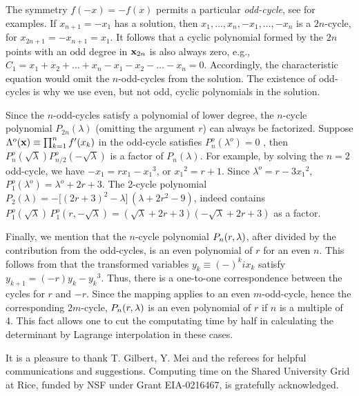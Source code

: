 \documentclass{ws-ijbc}
\begin{document}
The symmetry $f(-x) = -f(x)$ permits
  a particular \emph{odd-cycle},
  see  for examples.
If $x_{n+1} = -x_1$ has a solution,
  then $x_1, \ldots, x_{n}, -x_1, \ldots, -x_{n}$
  is a $2n$-cycle, for $x_{2n+1} = - x_{n+1} = x_1$.
%
It follows that a cyclic polynomial
  formed by the $2n$ points
  with an odd degree in $\mathbf{x}_{2n}$
  is also always zero,
  e.g., $C_1 = x_1 + x_2 + \dots + x_n - x_1 - x_2 - \dots - x_n = 0$.
Accordingly, the characteristic equation 
  would omit the $n$-odd-cycles from the solution.
The existence of odd-cycles is why we use even, but not odd,
  cyclic polynomials in the solution.


Since the $n$-odd-cycles satisfy a polynomial of lower degree,
  the $n$-cycle polynomial $P_{2n}(\lambda)$
  (omitting the argument $r$)
  can always be factorized.
%
Suppose $\Lambda^o(\mathbf{x}) \equiv \prod_{k = 1}^{n} f'(x_k)$ in the odd-cycle
 satisfies $P_{n}^o(\lambda^o) = 0$
\big[where $\lambda^o$ is the value of $\Lambda^o(\vx)$,
and $\lambda^o = \pm\sqrt \lambda$\,\big],
then $P^o_{n}(\sqrt \lambda) P^o_{n/2}(-\sqrt \lambda)$
is a factor of $P_{n}(\lambda)$.
%
For example, by solving the $n = 2$ odd-cycle,
  we have $- x_1 = r x_1 - {x_1}^3$, or ${x_1}^2 = r + 1$.
Since $\lambda^o = r - 3 {x_1}^2$,
$P^o_1(\lambda^o) = \lambda^o + 2 r + 3$.
%
The 2-cycle polynomial
  $P_2(\lambda) = -\big[(2r+3)^2 - \lambda\big]\,(\lambda + 2r^2-9)$,
  indeed contains
  $P^o_1(\sqrt \lambda) \, P^o_1(r, -\sqrt \lambda)
   = (\sqrt \lambda + 2 r + 3)(-\sqrt \lambda + 2 r + 3)$
  as a factor.


Finally, we mention that the $n$-cycle polynomial $P_n(r, \lambda)$,
  after divided by the contribution from the odd-cycles,
  is an even polynomial of $r$ for an even $n$.
%
This follows from that the transformed variables
  $y_k \equiv (-)^k i x_k$
satisfy
  $y_{k+1} = (-r) y_k - {y_k}^3$.
Thus, there is a one-to-one correspondence
  between the cycles for $r$ and $-r$.
%
Since the mapping applies to an even $m$-odd-cycle,
  hence the corresponding $2m$-cycle,
  $P_n(r, \lambda)$ is an even polynomial of $r$
  if $n$ is a multiple of 4.
%
This fact allows one to cut the computating time by half
  in calculating the determinant by Lagrange interpolation
  in these cases.




 \noindent
It is a pleasure to thank T. Gilbert, Y. Mei and the referees
  for helpful communications and suggestions.
Computing time on the Shared University Grid at Rice,
  funded by NSF under Grant EIA-0216467, is gratefully acknowledged.
\end{document}

